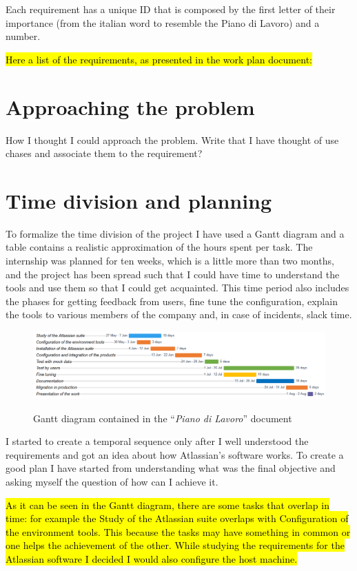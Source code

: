 	Each requirement has a unique ID that is composed by the first letter of their importance (from the italian word to resemble the Piano di Lavoro) and a number.

	\hl{Here a list of the requirements, as presented in the work plan document:}


\section{Approaching the problem}

	How I thought I could approach the problem.
	Write that I have thought of use chases and associate them to the requirement?

\section{Time division and planning}

	To formalize the time division of the project I have used a Gantt diagram and a table contains a realistic approximation of the hours spent per task.
	The internship was planned for ten weeks, which is a little more than two months, and the project has been spread such that I could have time to understand the tools and use them so that I could get acquainted.
	This time period also includes the phases for getting feedback from users, fine tune the configuration, explain the tools to various members of the company and, in case of incidents, slack time.
	\begin{figure}[H]
		\centering
		\includegraphics[width=1.1\textwidth]{resources/work_plan_gantt}\\
		\caption{Gantt diagram contained in the ``\textit{Piano di Lavoro}'' document}
	\end{figure}
	I started to create a temporal sequence only after I well understood the requirements and got an idea about how Atlassian's software works.
	To create a good plan I have started from understanding what was the final objective and asking myself the question of how can I achieve it.
	
	\hl{As it can be seen in the Gantt diagram, there are some tasks that overlap in time: for example the Study of the Atlassian suite overlaps with Configuration of the environment tools.
	This because the tasks may have something in common or one helps the achievement of the other.
	While studying the requirements for the Atlassian software I decided I would also configure the host machine.}
	
